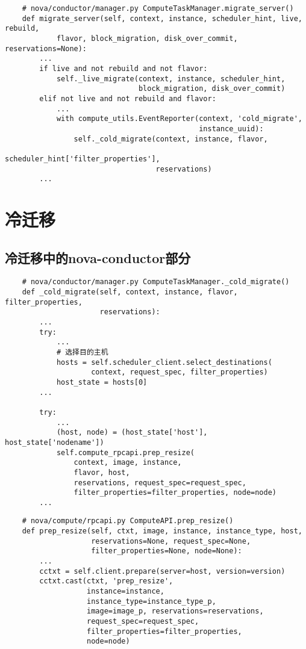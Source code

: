 \documentclass[a4paper,left=1.5cm,right=1.5cm,11pt]{article}
\begin{document}
	\begin{lstlisting}
	# nova/conductor/manager.py ComputeTaskManager.migrate_server()
	def migrate_server(self, context, instance, scheduler_hint, live, rebuild,
            flavor, block_migration, disk_over_commit, reservations=None):
        ...
        if live and not rebuild and not flavor:
            self._live_migrate(context, instance, scheduler_hint,
                               block_migration, disk_over_commit)
        elif not live and not rebuild and flavor:
            ...
            with compute_utils.EventReporter(context, 'cold_migrate',
                                             instance_uuid):
                self._cold_migrate(context, instance, flavor,
                                   scheduler_hint['filter_properties'],
                                   reservations)
        ...
	\end{lstlisting}

\section{冷迁移}

\subsection{冷迁移中的nova-conductor部分}

	\begin{lstlisting}
	# nova/conductor/manager.py ComputeTaskManager._cold_migrate()
	def _cold_migrate(self, context, instance, flavor, filter_properties,
                      reservations):
        ...
        try:
			...
			# 选择目的主机
            hosts = self.scheduler_client.select_destinations(
                    context, request_spec, filter_properties)
            host_state = hosts[0]
        ...

        try:
            ...
            (host, node) = (host_state['host'], host_state['nodename'])
            self.compute_rpcapi.prep_resize(
                context, image, instance,
                flavor, host,
                reservations, request_spec=request_spec,
                filter_properties=filter_properties, node=node)
        ...
	\end{lstlisting}

	\begin{lstlisting}
	# nova/compute/rpcapi.py ComputeAPI.prep_resize()
	def prep_resize(self, ctxt, image, instance, instance_type, host,
                    reservations=None, request_spec=None,
                    filter_properties=None, node=None):
        ...
		cctxt = self.client.prepare(server=host, version=version)
        cctxt.cast(ctxt, 'prep_resize',
                   instance=instance,
                   instance_type=instance_type_p,
                   image=image_p, reservations=reservations,
                   request_spec=request_spec,
                   filter_properties=filter_properties,
                   node=node)
	\end{lstlisting}
\end{document}
